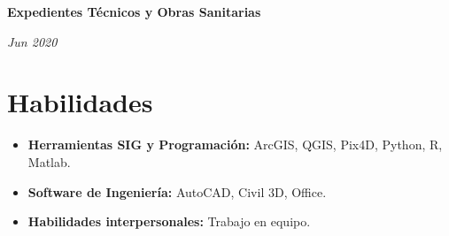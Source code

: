 \documentclass[10pt, letterpaper]{article}
\newenvironment{highlights}{
    \begin{itemize}[
        topsep=0.10 cm,
        parsep=0.10 cm,
        partopsep=0pt,
        itemsep=0pt,
        leftmargin=0.4 cm + 10pt
    ]
}{
    \end{itemize}
} %
\newenvironment{twocolentry}[2][]{
    \onecolentry
    \def\secondColumn{#2}
    \setcolumnwidth{\fill, 4.5 cm}
    \begin{paracol}{2}
}{
    \switchcolumn \raggedleft \secondColumn
    \end{paracol}
    \endonecolentry
} %
\begin{document}
\vspace{0.2 cm}

\begin{twocolentry}{
    \textit{Jun 2020}
}
\textbf{Expedientes Técnicos y Obras Sanitarias}
\end{twocolentry}

\section{Habilidades}

\begin{highlights}
    \item \textbf{Herramientas SIG y Programación:} ArcGIS, QGIS, Pix4D, Python, R, Matlab.
    \item \textbf{Software de Ingeniería:} AutoCAD, Civil 3D, Office.
    \item \textbf{Habilidades interpersonales:} Trabajo en equipo.
\end{highlights}
\end{document}
